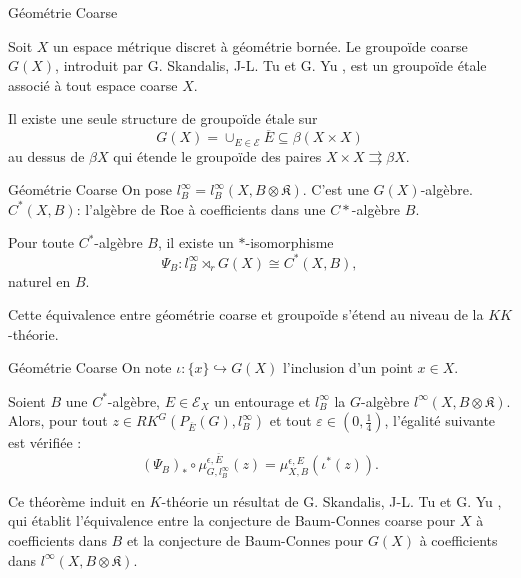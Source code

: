 \begin{frame}{Géométrie Coarse}

Soit $X$ un espace métrique discret à géométrie bornée. Le groupoïde coarse $G(X)$, introduit par G. Skandalis, J-L. Tu et G. Yu \cite{SkTuYu}, est un groupoïde étale associé à tout espace coarse $X$.\\
\vspace{0.3 cm}
\begin{definitionfr}
Il existe une seule structure de groupoïde étale sur 
\[G(X) = \cup_{E\in\mathcal E }\overline{E}\subseteq \beta (X\times X)\]
au dessus de $\beta X$ qui étende le groupoïde des paires $X\times X\rightrightarrows \beta X$.
\end{definitionfr} 

\end{frame}

\begin{frame}{Géométrie Coarse}
On pose $l_B^\infty = l_B^\infty(X,B\otimes \mathfrak K)$. C'est une $G(X)$-algèbre.\\
\vspace{0.3 cm}
$C^*(X,B)$: l'algèbre de Roe à coefficients dans une $C*$-algèbre $B$.\\
\vspace{0.3 cm}
\begin{propfr}
Pour toute $C^*$-algèbre $B$, il existe un $*$-isomorphisme 
\[\Psi_B : l_B^\infty \rtimes_r G(X) \cong C^*(X,B) ,\]
naturel en $B$.
\end{propfr} 
\vspace{0.3 cm}
Cette équivalence entre géométrie coarse et groupoïde s'étend au niveau de la $KK$-théorie.
\end{frame}


\begin{frame}{Géométrie Coarse}
On note $\iota : \{x\}\hookrightarrow G(X)$ l'inclusion d'un point $x\in X$.\\
\vspace{0.3 cm}
\begin{thmfr}
Soient $B$ une $C^*$-algèbre, $E\in\mathcal E_X$ un entourage et $l_B^\infty$ la $G$-algèbre $l^\infty(X,B\otimes \mathfrak K)$. Alors, pour tout $z\in RK^G(P_{\overline E}(G),l_B^\infty)$ et tout $\varepsilon\in(0,\frac{1}{4})$, l'égalité suivante est vérifiée :
\[(\Psi_B)_*\circ\mu^{\epsilon,\overline E}_{G,l_B^\infty} (z) = \mu_{X,B}^{\epsilon,E}(\iota^*(z)).\]
\end{thmfr}
\vspace{0.3 cm}
Ce théorème induit en $K$-théorie un résultat de G. Skandalis, J-L. Tu et G. Yu \cite{SkTuYu}, qui établit l'équivalence entre la conjecture de Baum-Connes coarse pour $X$ à coefficients dans $B$ et la conjecture de Baum-Connes pour $G(X)$ à coefficients dans $l^\infty(X,B\otimes \mathfrak K)$.
\end{frame}

